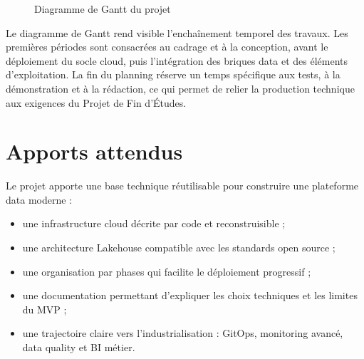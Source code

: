 \begin{figure}[H]
{
}
\caption{Diagramme de Gantt du projet}
\label{fig:gantt-projet}
\end{figure}

Le diagramme de Gantt rend visible l'enchaînement temporel des travaux. Les premières périodes sont consacrées au cadrage et à la conception, avant le déploiement du socle cloud, puis l'intégration des briques data et des éléments d'exploitation. La fin du planning réserve un temps spécifique aux tests, à la démonstration et à la rédaction, ce qui permet de relier la production technique aux exigences du Projet de Fin d'Études.
\newpage
\section{Apports attendus}

Le projet apporte une base technique réutilisable pour construire une plateforme data moderne :
\begin{itemize}
    \item une infrastructure cloud décrite par code et reconstruisible ;
    \item une architecture Lakehouse compatible avec les standards open source ;
    \item une organisation par phases qui facilite le déploiement progressif ;
    \item une documentation permettant d'expliquer les choix techniques et les limites du MVP ;
    \item une trajectoire claire vers l'industrialisation : GitOps, monitoring avancé, data quality et BI métier.
\end{itemize}

